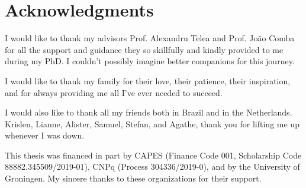 \manualmark
{} %

\begingroup
\let\clearpage\relax
\let\cleardoublepage\relax
\let\cleardoublepage\relax

\chapter*{Acknowledgments}

I would like to thank my advisors Prof. Alexandru Telea and Prof. Jo\~{a}o Comba for all the support and guidance they so skillfully and kindly provided to me during my PhD. I couldn't possibly imagine better companions for this journey.

I would like to thank my family for their love, their patience, their inspiration, and for always providing me all I've ever needed to succeed.

I would also like to thank all my friends both in Brazil and in the Netherlands. Krislen, Lianne, Alister, Samuel, Stefan, and Agathe, thank you for lifting me up whenever I was down.


\bigbreak

This thesis was financed in part by CAPES (Finance Code 001, Scholarship Code 88882.345509/2019-01), CNPq (Process 304336/2019-0), and by the University of Groningen. 
My sincere thanks to these organizations for their support.

\endgroup



